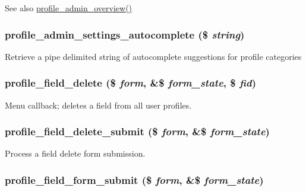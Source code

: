 \begin{DoxySeeAlso}{See also}
\hyperlink{group__forms_gafea18af3496251513291ed1ddc563fcc}{profile\_\-admin\_\-overview()} 
\end{DoxySeeAlso}
\hypertarget{profile_8admin_8inc_a2952c7f0dfb428dfdf77d7be37b707ad}{
\subsubsection[{profile\_\-admin\_\-settings\_\-autocomplete}]{\setlength{\rightskip}{0pt plus 5cm}profile\_\-admin\_\-settings\_\-autocomplete (\$ {\em string})}}
\label{profile_8admin_8inc_a2952c7f0dfb428dfdf77d7be37b707ad}
Retrieve a pipe delimited string of autocomplete suggestions for profile categories \hypertarget{profile_8admin_8inc_a2c4b876b5125112271191e78f4816c35}{
\subsubsection[{profile\_\-field\_\-delete}]{\setlength{\rightskip}{0pt plus 5cm}profile\_\-field\_\-delete (\$ {\em form}, \/  \&\$ {\em form\_\-state}, \/  \$ {\em fid})}}
\label{profile_8admin_8inc_a2c4b876b5125112271191e78f4816c35}
Menu callback; deletes a field from all user profiles. \hypertarget{profile_8admin_8inc_a4b5d228dbc4ee4a3091c72b8d4530f38}{
\subsubsection[{profile\_\-field\_\-delete\_\-submit}]{\setlength{\rightskip}{0pt plus 5cm}profile\_\-field\_\-delete\_\-submit (\$ {\em form}, \/  \&\$ {\em form\_\-state})}}
\label{profile_8admin_8inc_a4b5d228dbc4ee4a3091c72b8d4530f38}
Process a field delete form submission. \hypertarget{profile_8admin_8inc_a25efcaa4c4b8e9dc9568622ad0ab3411}{
\subsubsection[{profile\_\-field\_\-form\_\-submit}]{\setlength{\rightskip}{0pt plus 5cm}profile\_\-field\_\-form\_\-submit (\$ {\em form}, \/  \&\$ {\em form\_\-state})}}
